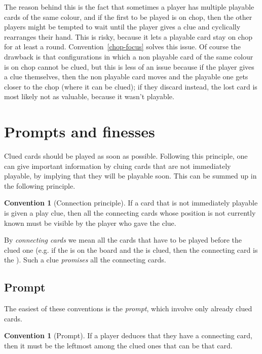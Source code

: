 \documentclass[a4paper]{article}
\theoremstyle{plain}
\theoremstyle{definition}
\newtheorem{convention}[theorem]{Convention}
\begin{document}
The reason behind this is the fact that sometimes a player has multiple playable cards of the same colour, and if the first to be played is on chop, then the other players might be tempted to wait until the player gives a clue and cyclically rearranges their hand. This is risky, because it lets a playable card stay on chop for at least a round. Convention~\ref{chop-focus} solves this issue. Of course the drawback is that configurations in which a non playable card of the same colour is on chop cannot be clued, but this is less of an issue because if the player gives a clue themselves, then the non playable card moves and the playable one gets closer to the chop (where it can be clued); if they discard instead, the lost card is most likely not as valuable, because it wasn't playable.


\section{Prompts and finesses}

Clued cards should be played as soon as possible. Following this principle, one can give important information by cluing cards that are not immediately playable, by implying that they will be playable soon. This can be summed up in the following principle.

\begin{convention}[Connection principle]
	\label{connection-principle}
	If a card that is not immediately playable is given a play clue, then all the connecting cards whose position is not currently known must be visible by the player who gave the clue.
\end{convention}

By \emph{connecting cards} we mean all the cards that have to be played before the clued one (e.g. if the  is on the board and the  is clued, then the connecting card is the ). Such a clue \emph{promises} all the connecting cards.

\subsection{Prompt}

The easiest of these conventions is the \emph{prompt}, which involve only already clued cards.

\begin{convention}[Prompt]
	\label{prompt}
	If a player deduces that they have a connecting card, then it must be the leftmost among the clued ones that can be that card.
\end{convention}
\end{document}
